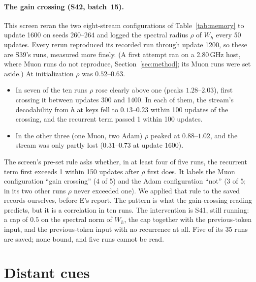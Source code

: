 \documentclass[11pt]{article}
\begin{document}
\paragraph{The gain crossing (S42, batch~15).} This screen reran the two eight-stream configurations of Table~\ref{tab:memory} to update 1600 on seeds 260--264 and logged the spectral radius $\rho$ of $W_h$ every 50 updates. Every rerun reproduced its recorded run through update 1200, so these are S39's runs, measured more finely. (A first attempt ran on a 2.80\,GHz host, where Muon runs do not reproduce, Section~\ref{sec:method}; its Muon runs were set aside.) At initialization $\rho$ was $0.52$--$0.63$.
\begin{itemize}
\item In seven of the ten runs $\rho$ rose clearly above one (peaks $1.28$--$2.03$), first crossing it between updates 300 and 1400. In each of them, the stream's decodability from $h$ at keys fell to $0.13$--$0.23$ within 100 updates of the crossing, and the recurrent term passed 1 within 100 updates.
\item In the other three (one Muon, two Adam) $\rho$ peaked at $0.88$--$1.02$, and the stream was only partly lost ($0.31$--$0.73$ at update 1600).
\end{itemize}
The screen's pre-set rule asks whether, in at least four of five runs, the recurrent term first exceeds 1 within 150 updates after $\rho$ first does. It labels the Muon configuration ``gain crossing'' (4 of 5) and the Adam configuration ``not'' (3 of 5; in its two other runs $\rho$ never exceeded one). We applied that rule to the saved records ourselves, before E's report. The pattern is what the gain-crossing reading predicts, but it is a correlation in ten runs. The intervention is S41, still running: a cap of $0.5$ on the spectral norm of $W_h$, the cap together with the previous-token input, and the previous-token input with no recurrence at all. Five of its 35 runs are saved; none bound, and five runs cannot be read.

\section{Distant cues}
\label{sec:far}
\end{document}
